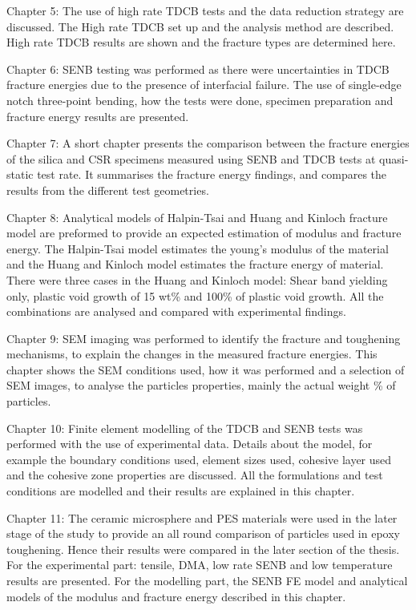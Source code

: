 \documentclass[numbers=noendperiod,chapterprefix=on]{icldt} %
\begin{document}
Chapter 5: The use of high rate TDCB tests and the data reduction strategy are discussed. The High rate TDCB set up and the analysis method are described. High rate TDCB results are shown and the fracture types are determined here.

Chapter 6: SENB testing was performed as there were uncertainties in TDCB fracture energies due to the presence of interfacial failure. The use of single-edge notch three-point bending, how the tests were done, specimen preparation and fracture energy results are presented.

Chapter 7: A short chapter presents the comparison between the fracture energies of the silica and CSR specimens measured using SENB and TDCB tests at quasi-static test rate. It summarises the fracture energy findings, and compares the results from the different test geometries.

Chapter 8: Analytical models of Halpin-Tsai and Huang and Kinloch fracture model are preformed to provide an expected estimation of modulus and fracture energy. 
The Halpin-Tsai model estimates the young's modulus of the material and the Huang and Kinloch model estimates the fracture energy of material. 
There were three cases in the Huang and Kinloch model: Shear band yielding only, plastic void growth of 15 wt\% and 100\% of plastic void growth. All the combinations are analysed and compared with experimental findings.

Chapter 9: SEM imaging was performed to identify the fracture and toughening mechanisms, to explain the changes in the measured fracture energies. 
This chapter shows the SEM conditions used, how it was performed and a selection of SEM images, to analyse the particles properties, mainly the actual weight \% of particles.

Chapter 10: Finite element modelling of the TDCB and SENB tests was performed with the use of experimental data. Details about the model, for example the boundary conditions used, element sizes used, cohesive layer used and the cohesive zone properties are discussed. All the formulations and test conditions are modelled and their results are explained in this chapter.

Chapter 11: The ceramic microsphere and PES materials were used in the later stage of the study to provide an all round comparison of particles used in epoxy toughening. Hence their results were compared in the later section of the thesis. For the experimental part: tensile, DMA, low rate SENB and low temperature results are presented. For the modelling part, the SENB FE model and analytical models of the modulus and fracture energy described in this chapter.
\end{document}
